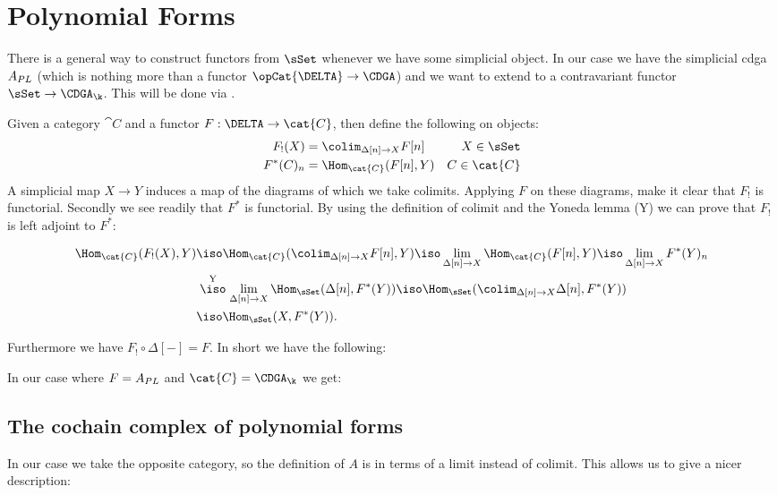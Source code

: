 
\section{Polynomial Forms}
\label{sec:polynomial-forms}

There is a general way to construct functors from $\sSet$ whenever we have some simplicial object. In our case we have the simplicial cdga ${A_{PL}}$ (which is nothing more than a functor $\opCat{\DELTA} \to \CDGA$) and we want to extend to a contravariant functor $\sSet \to \CDGA_\k$. This will be done via .

Given a category $\cat{C}$ and a functor $F: \DELTA \to \cat{C}$, then define the following on objects:
\begin{align*}
	F_!(X)      &= \colim_{\Delta[n] \to X} F[n] & X \in \sSet \\
	F^\ast(C)_n &= \Hom_{\cat{C}}(F[n], Y)       & C \in \cat{C}
\end{align*}
A simplicial map $X \to Y$ induces a map of the diagrams of which we take colimits. Applying $F$ on these diagrams, make it clear that $F_!$ is functorial. Secondly we see readily that $F^\ast$ is functorial. By using the definition of colimit and the Yoneda lemma (Y) we can prove that $F_!$ is left adjoint to $F^\ast$:

\begin{align*}
	\Hom_\cat{C}(F_!(X), Y) &\iso \Hom_\cat{C}(\colim_{\Delta[n] \to X} F[n], Y) \iso \lim_{\Delta[n] \to X} \Hom_\cat{C}(F[n], Y) \iso \lim_{\Delta[n] \to X} F^\ast(Y)_n \\
	&\stackrel{\text{Y}}{\iso} \lim_{\Delta[n] \to X} \Hom_\sSet(\Delta[n], F^\ast(Y)) \iso \Hom_\sSet(\colim_{\Delta[n] \to X} \Delta[n], F^\ast(Y)) \\
	&\iso \Hom_\sSet(X, F^\ast(Y)).
\end{align*}

Furthermore we have $F_! \circ \Delta[-] = F$. In short we have the following:


In our case where $F = {A_{PL}}$ and $\cat{C} = \CDGA_\k$ we get:



\subsection{The cochain complex of polynomial forms}

In our case we take the opposite category, so the definition of $A$ is in terms of a limit instead of colimit. This allows us to give a nicer description:

